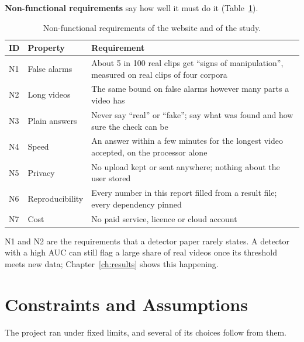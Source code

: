 \textbf{Non-functional requirements} say how well it must do it
(Table~\ref{tab:req-nonfunctional}).

\begin{table}[ht]
    \centering
    \small
    \caption{Non-functional requirements of the website and of the study.}
    \label{tab:req-nonfunctional}
    \begin{tabularx}{\textwidth}{@{}l l >{\raggedright\arraybackslash}X@{}}
        \toprule
        \textbf{ID} & \textbf{Property} & \textbf{Requirement} \\
        \midrule
        N1 & False alarms & About 5 in 100 real clips get ``signs of manipulation'', measured on real clips of four corpora \\
        N2 & Long videos & The same bound on false alarms however many parts a video has \\
        N3 & Plain answers & Never say ``real'' or ``fake''; say what was found and how sure the check can be \\
        N4 & Speed & An answer within a few minutes for the longest video accepted, on the processor alone \\
        N5 & Privacy & No upload kept or sent anywhere; nothing about the user stored \\
        N6 & Reproducibility & Every number in this report filled from a result file; every dependency pinned \\
        N7 & Cost & No paid service, licence or cloud account \\
        \bottomrule
    \end{tabularx}
\end{table}

N1 and N2 are the requirements that a detector paper rarely states. A
detector with a high AUC can still flag a large share of real videos once its
threshold meets new data; Chapter~\ref{ch:results} shows this happening.

\section{Constraints and Assumptions}

The project ran under fixed limits, and several of its choices follow from
them.


